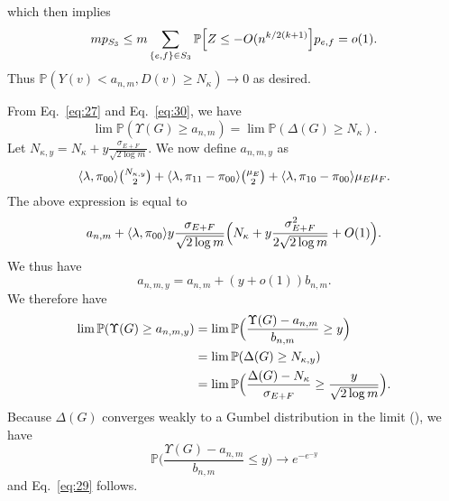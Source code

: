 \documentclass[10pt,journal,compsoc]{IEEEtran}
\theoremstyle{definition}
\begin{document}
\begin{IEEEproof}
\begin{IEEEproof}[Eq.~\eqref{eq:30}]
  which then implies
  \begin{equation}
    \label{eq:44}
    m p_{S_3} \leq m \sum_{\{e,f\} \in S_3} \mathbb{P} \Bigl[Z \leq
    - O(n^{k/2(k+1)}\Bigr] p_{e,f} = o(1).
  \end{equation}
  Thus $\mathbb{P}(Y(v) < a_{n,m}, D(v) \geq
      N_{\kappa}) \rightarrow 0$ as desired.
\end{IEEEproof}
From Eq.~\eqref{eq:27} and Eq.~\eqref{eq:30}, we have
\begin{equation}
  \label{eq:40}
 \lim
\mathbb{P}(\Upsilon(G) \geq a_{n,m}) = \lim \mathbb{P}(\Delta(G) \geq
N_{\kappa}).
 \end{equation}
Let $N_{\kappa,y} = N_\kappa + y \tfrac{\sigma_{E+F}}{\sqrt{2
    \log{m}}}$. We now define $a_{n,m,y}$ as 
\begin{equation*}
  \langle \lambda, \pi_{00} \rangle
    \tbinom{N_{\kappa,y}}{2} +
  \langle \lambda, \pi_{11} - \pi_{00} \rangle \tbinom{\mu_E}{2}  +
  \langle \lambda, \pi_{10} - \pi_{00} \rangle \mu_E \mu_F.
\end{equation*}
The above expression is equal to 
\begin{equation}
  \label{eq:57}
 a_{n,m} + \langle \lambda, \pi_{00} \rangle y
  \frac{\sigma_{E+F}}{\sqrt{2 \log m}} \Bigl(N_{\kappa} + y
  \frac{\sigma_{E+F}^{2}}{2 \sqrt{2 \log{m}}} + O(1) \Bigr).
\end{equation}
We thus have
\begin{equation*}
   a_{n,m,y} = a_{n,m} + (y + o(1)) b_{n,m}.
\end{equation*}
We therefore have
\begin{equation*}
  \begin{split}
  \lim \mathbb{P}(\Upsilon(G) \geq a_{n,m,y}) &= 
  \lim \mathbb{P}\Bigl(\frac{\Upsilon(G) - a_{n,m}}{b_{n,m}} \geq y \Bigr) \\
  &= \lim \mathbb{P}(\Delta(G) \geq N_{\kappa,y}) \\
  &= \lim \mathbb{P}\Bigl(\frac{\Delta(G) -
    N_{\kappa}}{\sigma_{E+F}} \geq \frac{y}{\sqrt{2 \log{m}}} \Bigr). \\
  \end{split}
\end{equation*}
Because $\Delta(G)$ converges weakly to a Gumbel
distribution in the limit
(\cite{bollobas85:_random_graph,rukhin:_limit_distr_graph_scan_statis}),
we have
\begin{equation}
  \label{eq:47}
  \mathbb{P}\Big(\frac{\Upsilon(G) - a_{n,m}}{b_{n,m}} \leq
    y\Bigr) \rightarrow e^{- e^{-y}} 
\end{equation}
and Eq.~\eqref{eq:29} follows.
\end{IEEEproof}

\end{document}
